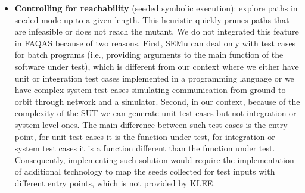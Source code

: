 \begin{itemize}
	\item \textbf{Controlling for reachability} (seeded symbolic execution): explore paths in seeded  mode up to a given length. 
	This heuristic quickly prunes paths that are infeasible or does not reach the mutant. 
	We do not integrated this feature in FAQAS because of two reasons. First, SEMu can deal only with test cases for batch programs (i.e., providing arguments to the main function of the software under test), which is different from our context where we either have unit or integration test cases implemented in a programming language or we have complex system test cases simulating communication from ground to orbit through network and a simulator. Second, in our context, because of the complexity of the SUT we can generate unit test cases but not integration or system level ones. The main difference between such test cases is the entry point, for unit test cases it is the function under test, for integration or system test cases it is a function different than the function under test. Consequently, implementing such solution would require the implementation of additional technology to map the seeds collected for test inputs with different entry points, which is not provided by KLEE.


\end{itemize}
